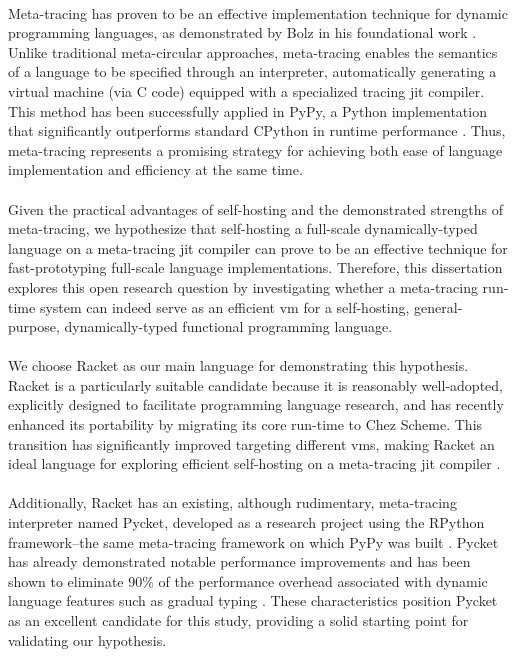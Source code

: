         \paragraph{}%
            Meta-tracing has proven to be an effective implementation technique for dynamic programming languages, as demonstrated by Bolz in his foundational work \cite{bolzPhDThesis}. Unlike traditional meta-circular approaches, meta-tracing enables the semantics of a language to be specified through an interpreter, automatically generating a virtual machine (via C code) equipped with a specialized tracing \gls{jit} compiler. This method has been successfully applied in PyPy, a Python implementation that significantly outperforms standard CPython in runtime performance \cite{pypy-main}. Thus, meta-tracing represents a promising strategy for achieving both ease of language implementation and efficiency at the same time.

        \paragraph{}%
            Given the practical advantages of self-hosting and the demonstrated strengths of meta-tracing, we hypothesize that self-hosting a full-scale dynamically-typed language on a meta-tracing \gls{jit} compiler can prove to be an effective technique for fast-prototyping full-scale language implementations. Therefore, this dissertation explores this open research question by investigating whether a meta-tracing run-time system can indeed serve as an efficient \gls{vm} for a self-hosting, general-purpose, dynamically-typed functional programming language.

        \paragraph{}%
            We choose Racket as our main language for demonstrating this hypothesis. Racket is a particularly suitable candidate because it is reasonably well-adopted, explicitly designed to facilitate programming language research, and has recently enhanced its portability by migrating its core run-time to Chez Scheme. This transition has significantly improved targeting different \glspl{vm}, making Racket an ideal language for exploring efficient self-hosting on a meta-tracing \gls{jit} compiler \cite{icfp2019}.

        \paragraph{}%
            Additionally, Racket has an existing, although rudimentary, meta-tracing interpreter named Pycket, developed as a research project using the RPython framework--the same meta-tracing framework on which PyPy was built \cite{bolzPhDThesis,bolzMetatracingMakesFast2014}. Pycket has already demonstrated notable performance improvements and has been shown to eliminate 90\% of the performance overhead associated with dynamic language features such as gradual typing \cite{pycketmain,pycketmain2}. These characteristics position Pycket as an excellent candidate for this study, providing a solid starting point for validating our hypothesis.

